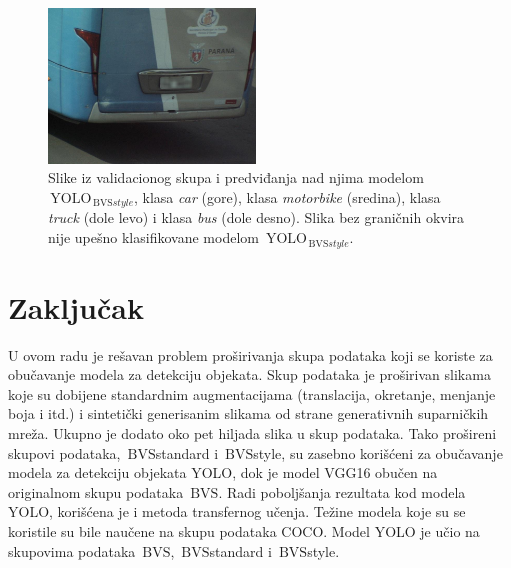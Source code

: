 \documentclass[12pt,oneside]{memoir}
\newcommand{\yolo}{\ensuremath{\,\textrm{YOLO}}}
\newcommand{\bvs}{\ensuremath{\,\textrm{BVS}}}
\begin{document}
\begin{figure}[!htbp]
  \includegraphics[width=0.49\textwidth]{matfmaster/yolo/v4/stylegan_augmentation/bus_0.jpg}
\caption{Slike iz validacionog skupa i predviđanja nad njima modelom $\yolo_{\bvs{style}}$, klasa \textit{car} (gore), klasa \textit{motorbike} (sredina), klasa \textit{truck} (dole levo) i klasa \textit{bus} (dole desno). Slika bez graničnih okvira nije upešno klasifikovane modelom $\yolo_{\bvs{style}}$. }\label{fig:section4_yolo4styleaug_images}
\end{figure}




\chapter{Zaključak}
\label{section6}

U ovom radu je rešavan problem proširivanja skupa podataka koji se koriste za obučavanje modela za detekciju objekata. Skup podataka je proširivan slikama koje su dobijene standardnim augmentacijama (translacija, okretanje, menjanje boja i itd.) i sintetički generisanim slikama od strane generativnih suparničkih mreža. Ukupno je dodato oko pet hiljada slika u skup podataka. Tako prošireni skupovi podataka, \bvs{standard} i \bvs{style}, su zasebno korišćeni za obučavanje modela za detekciju objekata YOLO, dok je model VGG16 obučen na originalnom skupu podataka \bvs{}. Radi poboljšanja rezultata kod modela YOLO, korišćena je i metoda transfernog učenja. Težine modela koje su se koristile su bile naučene na skupu podataka COCO. Model YOLO je učio na skupovima podataka \bvs{}, \bvs{standard} i \bvs{style}.
\end{document}
